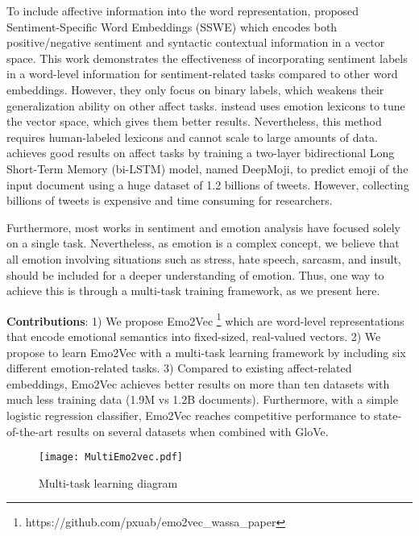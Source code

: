 \documentclass[11pt,a4paper]{article}
\begin{document}
To include affective information into the word representation,  proposed Sentiment-Specific Word Embeddings (SSWE)  which encodes both positive/negative sentiment and syntactic contextual information in a vector space. This work demonstrates the effectiveness of incorporating sentiment labels in a word-level information for sentiment-related tasks compared to other word embeddings.  However, they only focus on binary labels, which weakens their generalization ability on other affect tasks.  instead uses emotion lexicons to tune the vector space, which gives them better results. Nevertheless, this method requires human-labeled lexicons and cannot scale to large amounts of data.  achieves good results on affect tasks by training a two-layer bidirectional Long Short-Term Memory (bi-LSTM) model, named DeepMoji, to predict emoji of the input document using a huge dataset of 1.2 billions of tweets. However, collecting billions of tweets is expensive and time consuming for researchers.

Furthermore, most works in sentiment and emotion analysis have focused solely on a single task. Nevertheless, as emotion is a complex concept, we believe that all emotion involving situations such as stress, hate speech, sarcasm, and insult, should be included for a deeper understanding of emotion. Thus, one way to achieve this is through a multi-task training framework, as we present here.  



\noindent\textbf{Contributions}: 1) We propose Emo2Vec \footnote{https://github.com/pxuab/emo2vec\_wassa\_paper}  which are word-level representations that encode emotional semantics into fixed-sized, real-valued vectors. 2) We propose to learn Emo2Vec with a multi-task learning framework by including six different emotion-related tasks. 3) Compared to existing affect-related embeddings, Emo2Vec achieves better results on more than ten datasets with much less training data (1.9M vs 1.2B documents). Furthermore, with a simple logistic regression classifier, Emo2Vec reaches competitive performance to state-of-the-art results on several datasets when combined with GloVe. 

\begin{figure}[t]
  \centering
  \texttt{[image: MultiEmo2vec.pdf]}
  \vspace{-10pt}
  
  \caption{Multi-task learning diagram}
  
  \vspace{-10pt}
  \label{fig:multi_task}
\end{figure}
\end{document}
